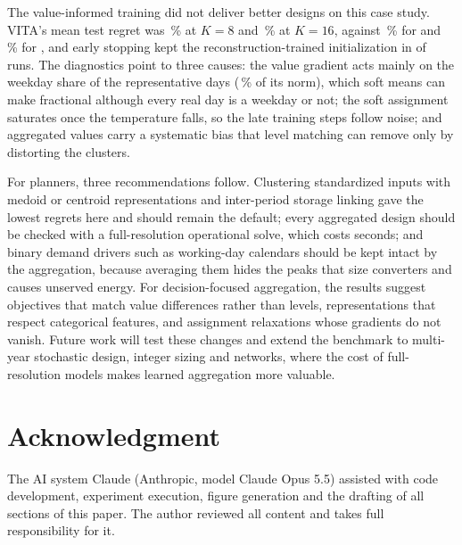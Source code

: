 \documentclass[journal]{IEEEtran}
\begin{document}
The value-informed training did not deliver better designs on this case study. VITA's mean test regret was \RegVITAKeight\,\% at $K=8$ and \RegVITAKsixteen\,\% at $K=16$, against \RegBestBaseKeight\,\% for \BestBaseNameKeight{} and \RegBestBaseKsixteen\,\% for \BestBaseNameKsixteen{}, and early stopping kept the reconstruction-trained initialization in \NInitSelected{} of \NRuns{} runs. The diagnostics point to three causes: the value gradient acts mainly on the weekday share of the representative days (\GradShareWeekday\,\% of its norm), which soft means can make fractional although every real day is a weekday or not; the soft assignment saturates once the temperature falls, so the late training steps follow noise; and aggregated values carry a systematic bias that level matching can remove only by distorting the clusters.

For planners, three recommendations follow. Clustering standardized inputs with medoid or centroid representations and inter-period storage linking gave the lowest regrets here and should remain the default; every aggregated design should be checked with a full-resolution operational solve, which costs seconds; and binary demand drivers such as working-day calendars should be kept intact by the aggregation, because averaging them hides the peaks that size converters and causes unserved energy. For decision-focused aggregation, the results suggest objectives that match value differences rather than levels, representations that respect categorical features, and assignment relaxations whose gradients do not vanish. Future work will test these changes and extend the benchmark to multi-year stochastic design, integer sizing and networks, where the cost of full-resolution models makes learned aggregation more valuable.

\section*{Acknowledgment}
The AI system Claude (Anthropic, model Claude Opus 5.5) assisted with code development, experiment execution, figure generation and the drafting of all sections of this paper. The author reviewed all content and takes full responsibility for it.


\end{document}
